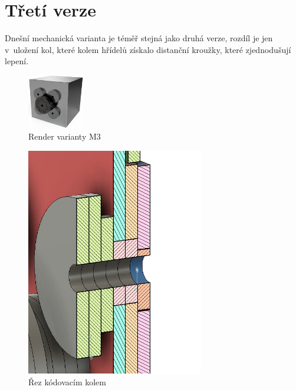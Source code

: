 \section{Třetí verze}

Dnešní mechanická varianta je téměř stejná jako druhá verze, rozdíl je jen v~uložení kol, které kolem hřídelů získalo distanční kroužky, které
zjednodušují lepení. 

\begin{figure}[htbp]
    \centering
    \includegraphics[width=70pt]{kapitoly/obrazky/M3/predni_render.png}
    \caption{Render varianty M3}
    \label{fig:M3-render}
\end{figure}

\begin{figure}[htbp]
    \centering
    \includegraphics[width=220pt]{kapitoly/obrazky/M3/rez.png}
    \caption{Řez kódovacím kolem}
    \label{fig:M3-rez-kolem}
\end{figure}

\newpage